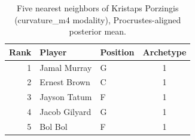 \begin{table}[htbp]
  \centering\small
  \begin{tabular}{rllc}
    \toprule
    Rank & Player & Position & Archetype \\
    \midrule
    1 & Jamal Murray & G & 1 \\
    2 & Ernest Brown & C & 1 \\
    3 & Jayson Tatum & F & 1 \\
    4 & Jacob Gilyard & G & 1 \\
    5 & Bol Bol & F & 1 \\
    \bottomrule
  \end{tabular}
  \caption{Five nearest neighbors of Kristaps Porzingis (curvature_m4 modality), Procrustes-aligned posterior mean.}
  \label{tab:Kristaps_Porzingis_neighbors_curvature_m4}
\end{table}

